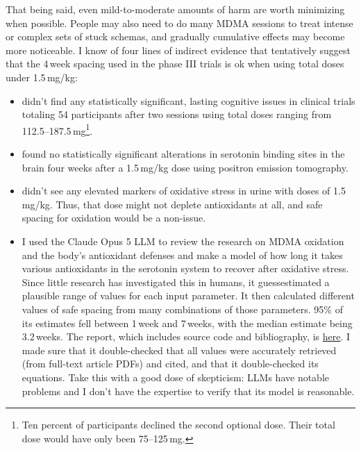 \documentclass[11pt,oneside]{book}
\begin{document}
That being said, even mild-to-moderate amounts of harm are worth minimizing when possible. People may also need to do many MDMA sessions to treat intense or complex sets of stuck schemas, and gradually cumulative effects may become more noticeable. I know of four lines of indirect evidence that tentatively suggest that the 4\,week spacing used in the phase III trials is ok when using total doses under 1.5\,mg/kg:
\begin{itemize}
    \item \textcite{mithoeferRETRACTEDARTICLEMDMAassisted2019} didn't find any statistically significant, lasting cognitive issues in clinical trials totaling 54 participants after two sessions using total doses ranging from 112.5--187.5\,mg\footnote{Ten percent of participants declined the second optional dose. Their total dose would have only been 75--125\,mg.}.
    \item \textcite{guckerEffectsEcstasyMDMA2000} found no statistically significant alterations in serotonin binding sites in the brain four weeks after a 1.5\,mg/kg dose using positron emission tomography.
    \item \textcite{baggottSupplements} didn't see any elevated markers of oxidative stress in urine with doses of 1.5\,mg/kg. Thus, that dose might not deplete antioxidants at all, and safe spacing for oxidation would be a non-issue.
    \item I used the Claude Opus 5 LLM to review the research on MDMA oxidation and the body's antioxidant defenses and make a model of how long it takes various antioxidants in the serotonin system to recover after oxidative stress. Since little research has investigated this in humans, it guessestimated a plausible range of values for each input parameter. It then calculated different values of safe spacing from many combinations of those parameters. 95\% of its estimates fell between 1\,week and 7\,weeks, with the median estimate being 3.2\,weeks. The report, which includes source code and bibliography, is \href{https://github.com/groeneveld/mdma-guide/blob/main/auxillaryFiles/2026-08-05-mdma-antioxidant-buffer-recovery.pdf}{here}. I made sure that it double-checked that all values were accurately retrieved (from full-text article PDFs) and cited, and that it double-checked its equations. Take this with a good dose of skepticism: LLMs have notable problems and I don't have the expertise to verify that its model is reasonable.
\end{itemize}
\end{document}
